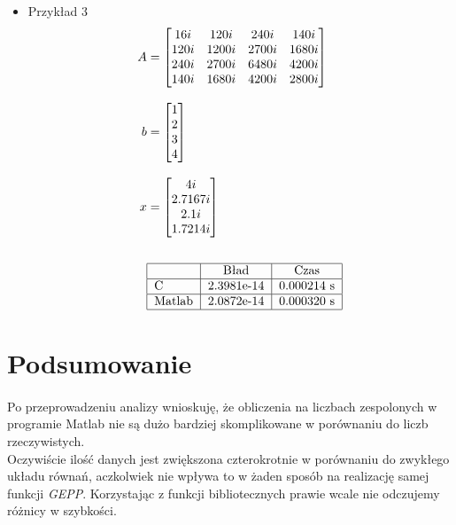 \documentclass[12pt, flegn, leqno]{article}
\begin{document}
\begin{itemize}
            \item{Przykład 3}
            \begin{align*}
                A &= 
                \begin{bmatrix}
                    16i  &  120i &  240i &  140i\\
                    120i & 1200i & 2700i & 1680i\\
                    240i & 2700i & 6480i & 4200i\\
                    140i & 1680i & 4200i & 2800i\\
                \end{bmatrix} \\[3mm]
                b &= 
                \begin{bmatrix}
                    1\\
                    2\\
                    3\\
                    4\\
                \end{bmatrix} \\[3mm]
                x &= 
                \begin{bmatrix}
                    4i     \\
                    2.7167i\\
                    2.1i   \\
                    1.7214i\\
                \end{bmatrix} \\[6mm] 
                &\begin{tabular}{ | l | c | c |}
                    \hline 
                    & Bład & Czas\\ \hline
                    C & 2.3981e-14 & 0.000214 s \\ \hline
                    Matlab & 2.0872e-14 & 0.000320 s \\
                    \hline
                \end{tabular}
            \end{align*}
            \end{itemize}

    \section{Podsumowanie}
        \paragraph{}
        Po przeprowadzeniu analizy wnioskuję, że obliczenia na liczbach zespolonych w programie 
        Matlab nie są dużo bardziej skomplikowane w porównaniu do liczb rzeczywistych.\\
        \indent Oczywiście ilość danych jest zwiększona czterokrotnie w porównaniu do zwykłego układu
        równań, aczkolwiek nie wpływa to w żaden sposób na realizację samej funkcji \textit{GEPP}.
        Korzystając z funkcji bibliotecznych prawie wcale nie odczujemy różnicy w szybkości.
\end{document}
